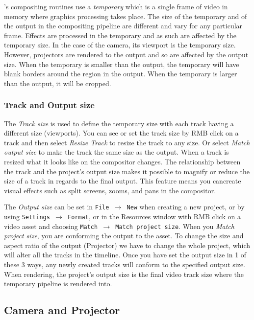 \CGG{}'s compositing routines use a \textit{temporary} which is a single frame of video in
memory where graphics processing takes place. The size of the temporary and of the output in
the compositing pipeline are different and vary for any particular frame.  Effects are processed in
the temporary and as such are affected by the temporary size.  In the case of the camera, its
viewport is the temporary size. However, projectors are rendered to the output and so are affected
by the output size. When the temporary is smaller than the output, the temporary will have blank
borders around the region in the output.  When the temporary is larger than the output, it will be
cropped.

\subsubsection*{Track and Output size}%
\label{ssub:track_size}

The \textit{Track size} is used to define the temporary size with each track having a different size (viewports).
You can see or set the track size by RMB click on a track and then select \emph{Resize Track} to resize
the track to any size. Or select \emph{Match output size} to make the track the same size as the
output.  When a track is resized what it looks like on the compositor changes.  The relationship
between the track and the project's output size makes it possible to magnify or reduce the size of
a track in regards to the final output. This feature means you cancreate visual effects such as split
screens, zooms, and pans in the compositor.

The \textit{Output size} can be set in \texttt{File $\rightarrow$ New} when creating a new project,
or by using \texttt{Settings $\rightarrow$ Format}, or in the Resources window with RMB click on
a video asset and choosing \texttt{Match $\rightarrow$ Match project size}. When you \emph{Match project size}, you
are conforming the output to the asset. To change the size and aspect ratio of the output (Projector) we have to change the whole project, which will alter all the tracks in the timeline. Once you have set the output size in 1 of these 3 ways,
any newly created tracks will conform to the specified output size.  When rendering, the project's
output size is the final video track size where the temporary pipeline is rendered into.  

\subsection{Camera and Projector}%
\label{sub:camera_and_projector}

